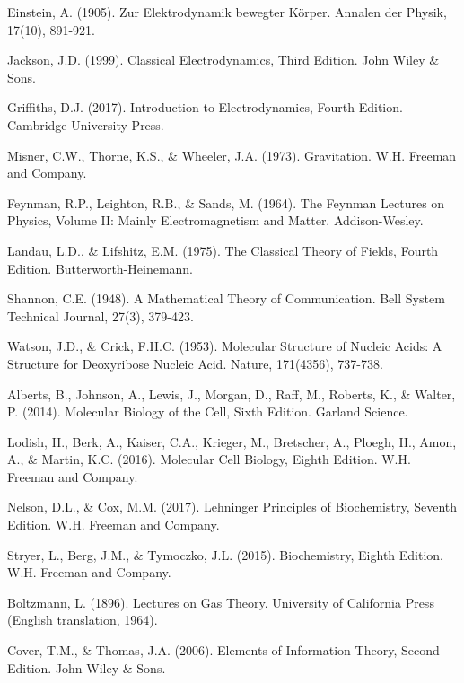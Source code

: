 \documentclass[12pt,a4paper]{article}
\begin{document}
\begin{thebibliography}{99}

Einstein, A. (1905). Zur Elektrodynamik bewegter Körper. Annalen der Physik, 17(10), 891-921.

Jackson, J.D. (1999). Classical Electrodynamics, Third Edition. John Wiley \& Sons.

Griffiths, D.J. (2017). Introduction to Electrodynamics, Fourth Edition. Cambridge University Press.

Misner, C.W., Thorne, K.S., \& Wheeler, J.A. (1973). Gravitation. W.H. Freeman and Company.

Feynman, R.P., Leighton, R.B., \& Sands, M. (1964). The Feynman Lectures on Physics, Volume II: Mainly Electromagnetism and Matter. Addison-Wesley.

Landau, L.D., \& Lifshitz, E.M. (1975). The Classical Theory of Fields, Fourth Edition. Butterworth-Heinemann.

Shannon, C.E. (1948). A Mathematical Theory of Communication. Bell System Technical Journal, 27(3), 379-423.

Watson, J.D., \& Crick, F.H.C. (1953). Molecular Structure of Nucleic Acids: A Structure for Deoxyribose Nucleic Acid. Nature, 171(4356), 737-738.

Alberts, B., Johnson, A., Lewis, J., Morgan, D., Raff, M., Roberts, K., \& Walter, P. (2014). Molecular Biology of the Cell, Sixth Edition. Garland Science.

Lodish, H., Berk, A., Kaiser, C.A., Krieger, M., Bretscher, A., Ploegh, H., Amon, A., \& Martin, K.C. (2016). Molecular Cell Biology, Eighth Edition. W.H. Freeman and Company.

Nelson, D.L., \& Cox, M.M. (2017). Lehninger Principles of Biochemistry, Seventh Edition. W.H. Freeman and Company.

Stryer, L., Berg, J.M., \& Tymoczko, J.L. (2015). Biochemistry, Eighth Edition. W.H. Freeman and Company.

Boltzmann, L. (1896). Lectures on Gas Theory. University of California Press (English translation, 1964).

Cover, T.M., \& Thomas, J.A. (2006). Elements of Information Theory, Second Edition. John Wiley \& Sons.


\end{thebibliography}
\end{document}

